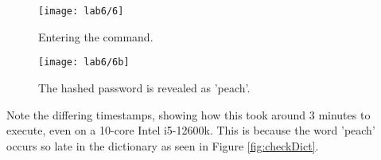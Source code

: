 \begin{figure}[H]
    \centering
    \texttt{[image: lab6/6]}
    \caption{Entering the command.}
    \label{fig:cracking}
\end{figure}

\begin{figure}[H]
    \centering
    \texttt{[image: lab6/6b]}
    \caption{The hashed password is revealed as 'peach'.}
    \label{fig:cracked}
\end{figure}

Note the differing timestamps, showing how this took around 3 minutes to execute, even on a 10-core
Intel i5-12600k.
This is because the word 'peach' occurs so late in the dictionary as seen in Figure \ref{fig:checkDict}.


